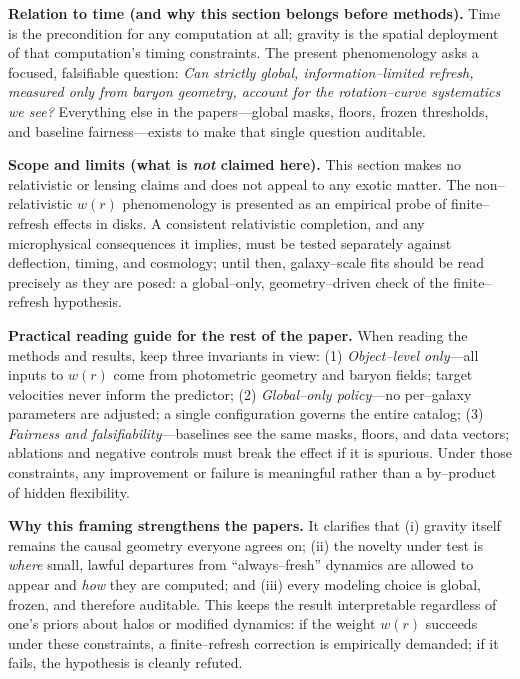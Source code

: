 \documentclass[usenatbib]{mnras}
\begin{document}
\vspace{0.5em}
\noindent\textbf{Relation to time (and why this section belongs before methods).}
Time is the precondition for any computation at all; gravity is the spatial deployment of that computation’s timing constraints. The present phenomenology asks a focused, falsifiable question: \emph{Can strictly global, information–limited refresh, measured only from baryon geometry, account for the rotation–curve systematics we see?}
Everything else in the papers—global masks, floors, frozen thresholds, and baseline fairness—exists to make that single question auditable.

\vspace{0.5em}
\noindent\textbf{Scope and limits (what is \emph{not} claimed here).}
This section makes no relativistic or lensing claims and does not appeal to any exotic matter. The non–relativistic $w(r)$ phenomenology is presented as an empirical probe of finite–refresh effects in disks. A consistent relativistic completion, and any microphysical consequences it implies, must be tested separately against deflection, timing, and cosmology; until then, galaxy–scale fits should be read precisely as they are posed: a global–only, geometry–driven check of the finite–refresh hypothesis.

\vspace{0.5em}
\noindent\textbf{Practical reading guide for the rest of the paper.}
When reading the methods and results, keep three invariants in view:
(1) \emph{Object–level only}—all inputs to $w(r)$ come from photometric geometry and baryon fields; target velocities never inform the predictor;
(2) \emph{Global–only policy}—no per–galaxy parameters are adjusted; a single configuration governs the entire catalog;
(3) \emph{Fairness and falsifiability}—baselines see the same masks, floors, and data vectors; ablations and negative controls must break the effect if it is spurious.
Under those constraints, any improvement or failure is meaningful rather than a by–product of hidden flexibility.

\vspace{0.5em}
\noindent\textbf{Why this framing strengthens the papers.}
It clarifies that (i) gravity itself remains the causal geometry everyone agrees on; (ii) the novelty under test is \emph{where} small, lawful departures from “always–fresh” dynamics are allowed to appear and \emph{how} they are computed; and (iii) every modeling choice is global, frozen, and therefore auditable.
This keeps the result interpretable regardless of one’s priors about halos or modified dynamics: if the weight $w(r)$ succeeds under these constraints, a finite–refresh correction is empirically demanded; if it fails, the hypothesis is cleanly refuted.
\end{document}
